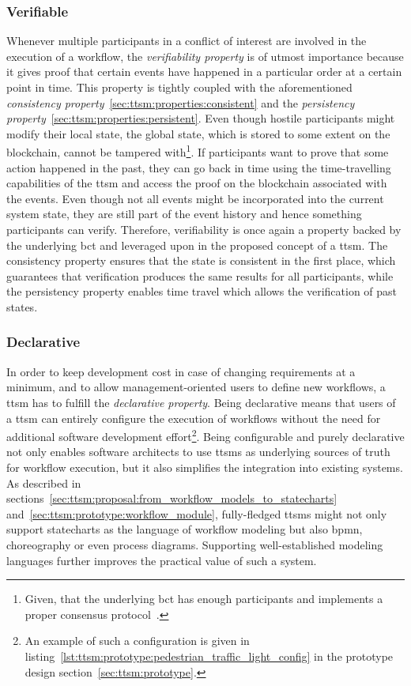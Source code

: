 \subsubsection{Verifiable}
\label{sec:ttsm:properties:verifiable}
Whenever multiple participants in a conflict of interest are involved in the execution of a workflow, the \textit{verifiability property} is of utmost importance because it gives proof that certain events have happened in a particular order at a certain point in time. This property is tightly coupled with the aforementioned \textit{consistency property}~\ref{sec:ttsm:properties:consistent} and the \textit{persistency property}~\ref{sec:ttsm:properties:persistent}. Even though hostile participants might modify their local state, the global state, which is stored to some extent on the blockchain, cannot be tampered with\footnote{Given, that the underlying \gls{bct} has enough participants and implements a proper consensus protocol~\cite{public_chains_make_private_chains_obsolete}.}. If participants want to prove that some action happened in the past, they can go back in time using the time-travelling capabilities of the \gls{ttsm} and access the proof on the blockchain associated with the events. Even though not all events might be incorporated into the current system state, they are still part of the event history and hence something participants can verify. Therefore, verifiability is once again a property backed by the underlying \gls{bct} and leveraged upon in the proposed concept of a \gls{ttsm}. The consistency property ensures that the state is consistent in the first place, which guarantees that verification produces the same results for all participants, while the persistency property enables time travel which allows the verification of past states.

\subsubsection{Declarative}
\label{sec:ttsm:properties:declarative}
In order to keep development cost in case of changing requirements at a minimum, and to allow management-oriented users to define new workflows, a \gls{ttsm} has to fulfill the \textit{declarative property}. Being declarative means that users of a \gls{ttsm} can entirely configure the execution of workflows without the need for additional software development effort\footnote{An example of such a configuration is given in listing~\ref{lst:ttsm:prototype:pedestrian_traffic_light_config} in the prototype design section~\ref{sec:ttsm:prototype}.}. Being configurable and purely declarative not only enables software architects to use \glspl{ttsm} as underlying sources of truth for workflow execution, but it also simplifies the integration into existing systems. As described in sections~\ref{sec:ttsm:proposal:from_workflow_models_to_statecharts} and~\ref{sec:ttsm:prototype:workflow_module}, fully-fledged \glspl{ttsm} might not only support statecharts as the language of workflow modeling but also \gls{bpmn}, choreography or even process diagrams. Supporting well-established modeling languages further improves the practical value of such a system.

